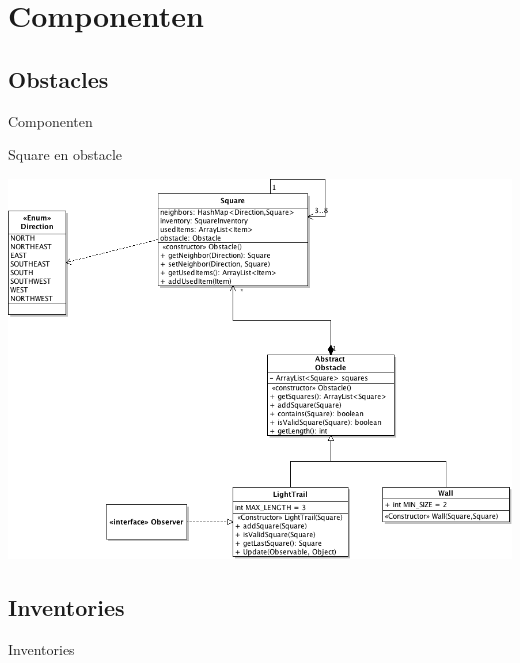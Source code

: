 \documentclass[t]{beamer}
\begin{document}
\section{Componenten}
\subsection{Obstacles}
\begin{frame}{Componenten}
\begin{multicols}{2}
\tableofcontents[currentsection]
\end{multicols}
\end{frame}

\begin{frame}[plain]{Square en obstacle}
\begin{center}
\includegraphics[width= 0.9\linewidth]{../uml/classdiagramObstaclesSquare.png}
\end{center}
\end{frame}

\subsection{Inventories}
\begin{frame}{Inventories}
\begin{multicols}{2}
\tableofcontents[currentsection]
\end{multicols}
\end{frame}
\end{document}
